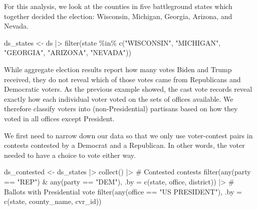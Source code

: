 \documentclass[fleqn,10pt]{wlscirep}
\newenvironment{Shaded}{\begin{snugshade}}{\end{snugshade}}
\newcommand{\AttributeTok}[1]{\textcolor[rgb]{0.40,0.45,0.13}{#1}}
\newcommand{\CommentTok}[1]{\textcolor[rgb]{0.37,0.37,0.37}{#1}}
\newcommand{\FunctionTok}[1]{\textcolor[rgb]{0.28,0.35,0.67}{#1}}
\newcommand{\NormalTok}[1]{\textcolor[rgb]{0.00,0.23,0.31}{#1}}
\newcommand{\OtherTok}[1]{\textcolor[rgb]{0.00,0.23,0.31}{#1}}
\newcommand{\SpecialCharTok}[1]{\textcolor[rgb]{0.37,0.37,0.37}{#1}}
\newcommand{\StringTok}[1]{\textcolor[rgb]{0.13,0.47,0.30}{#1}}
\begin{document}
For this analysis, we look at the counties in five battleground states
which together decided the election: Wisconsin, Michigan, Georgia,
Arizona, and Nevada.

\begin{Shaded}
\begin{Highlighting}[]
\NormalTok{ds\_states }\OtherTok{\textless{}{-}}\NormalTok{ ds }\SpecialCharTok{|\textgreater{}} 
  \FunctionTok{filter}\NormalTok{(state }\SpecialCharTok{\%in\%} \FunctionTok{c}\NormalTok{(}\StringTok{"WISCONSIN"}\NormalTok{, }\StringTok{"MICHIGAN"}\NormalTok{, }\StringTok{"GEORGIA"}\NormalTok{, }\StringTok{"ARIZONA"}\NormalTok{, }\StringTok{"NEVADA"}\NormalTok{))}
\end{Highlighting}
\end{Shaded}

While aggregate election results report how many votes Biden and Trump
received, they do not reveal which of those votes came from Republicans
and Democratic voters. As the previous example showed, the cast vote
records reveal exactly how each individual voter voted on the sets of
offices available. We therefore classify voters into (non-Presidential)
partisans based on how they voted in all offices except President.

We first need to narrow down our data so that we only use voter-contest
pairs in contests contested by a Democrat and a Republican. In other
words, the voter needed to have a choice to vote either way.

\begin{Shaded}
\begin{Highlighting}[]
\NormalTok{ds\_contested }\OtherTok{\textless{}{-}}\NormalTok{ ds\_states }\SpecialCharTok{|\textgreater{}} 
  \FunctionTok{collect}\NormalTok{() }\SpecialCharTok{|\textgreater{}} 
  \CommentTok{\# Contested contests}
  \FunctionTok{filter}\NormalTok{(}\FunctionTok{any}\NormalTok{(party }\SpecialCharTok{==} \StringTok{"REP"}\NormalTok{) }\SpecialCharTok{\&} \FunctionTok{any}\NormalTok{(party }\SpecialCharTok{==} \StringTok{"DEM"}\NormalTok{), }
         \AttributeTok{.by =} \FunctionTok{c}\NormalTok{(state, office, district)) }\SpecialCharTok{|\textgreater{}} 
  \CommentTok{\# Ballots with Presidential vote}
  \FunctionTok{filter}\NormalTok{(}\FunctionTok{any}\NormalTok{(office }\SpecialCharTok{==} \StringTok{"US PRESIDENT"}\NormalTok{), }
         \AttributeTok{.by =} \FunctionTok{c}\NormalTok{(state, county\_name, cvr\_id))}
\end{Highlighting}
\end{Shaded}
\end{document}
